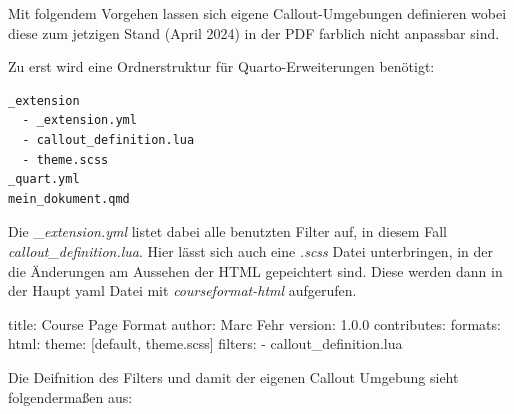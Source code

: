 \documentclass[
  letterpaper,
  DIV=11]{scrartcl}
\newenvironment{Shaded}{\begin{snugshade}}{\end{snugshade}}
\newcommand{\AttributeTok}[1]{\textcolor[rgb]{0.40,0.45,0.13}{#1}}
\newcommand{\FloatTok}[1]{\textcolor[rgb]{0.68,0.00,0.00}{#1}}
\newcommand{\FunctionTok}[1]{\textcolor[rgb]{0.28,0.35,0.67}{#1}}
\newcommand{\KeywordTok}[1]{\textcolor[rgb]{0.00,0.23,0.31}{#1}}
\begin{document}
Mit folgendem Vorgehen lassen sich eigene Callout-Umgebungen definieren
wobei diese zum jetzigen Stand (April 2024) in der PDF farblich nicht
anpassbar sind.

Zu erst wird eine Ordnerstruktur für Quarto-Erweiterungen benötigt:

\begin{verbatim}
_extension
  - _extension.yml
  - callout_definition.lua
  - theme.scss
_quart.yml
mein_dokument.qmd
\end{verbatim}

Die \_\emph{extension.yml} listet dabei alle benutzten Filter auf, in
diesem Fall \emph{callout\_definition.lua}. Hier lässt sich auch eine
\emph{.scss} Datei unterbringen, in der die Änderungen am Aussehen der
HTML gepeichtert sind. Diese werden dann in der Haupt yaml Datei mit
\emph{courseformat-html} aufgerufen.

\begin{Shaded}
\begin{Highlighting}[]
\FunctionTok{title}\KeywordTok{:}\AttributeTok{ Course Page Format}
\FunctionTok{author}\KeywordTok{:}\AttributeTok{ Marc Fehr}
\FunctionTok{version}\KeywordTok{:}\AttributeTok{ }\FloatTok{1.0.0}
\FunctionTok{contributes}\KeywordTok{:}
\AttributeTok{  }\FunctionTok{formats}\KeywordTok{:}
\AttributeTok{    }\FunctionTok{html}\KeywordTok{:}
\AttributeTok{      }\FunctionTok{theme}\KeywordTok{:}\AttributeTok{ }\KeywordTok{[}\AttributeTok{default}\KeywordTok{,}\AttributeTok{ theme.scss}\KeywordTok{]}
\AttributeTok{  }\FunctionTok{filters}\KeywordTok{:}
\AttributeTok{    }\KeywordTok{{-}}\AttributeTok{ callout\_definition.lua}
\end{Highlighting}
\end{Shaded}

Die Deifnition des Filters und damit der eigenen Callout Umgebung sieht
folgendermaßen aus:
\end{document}
